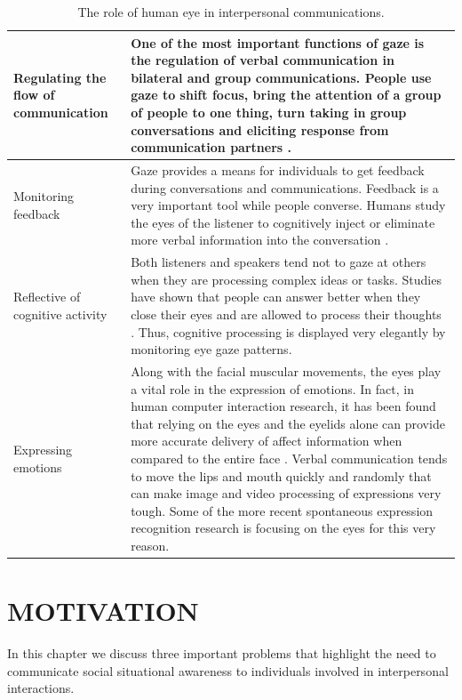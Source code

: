 \documentclass[oneside,11pt]{memoir}
\begin{document}
\begin{table}[hpdf]
\begin{center}
\caption{The role of human eye in interpersonal communications.}
\label{Tab:Table4}
\begin{tabularx}{5.5in}{|X|X|}
\hline
Regulating the flow of communication & One of the most important functions of gaze is the regulation of verbal communication in bilateral and group communications. People use gaze to shift focus, bring the attention of a group of people to one thing, turn taking in group conversations \cite{mast_dominance_2002} and eliciting response from communication partners \cite{bavelas_listener_2002}. \\
\hline
Monitoring feedback & Gaze provides a means for individuals to get feedback during conversations and communications. Feedback is a very important tool while people converse. Humans study the eyes of the listener to cognitively inject or eliminate more verbal information into the conversation \cite{van_dulmen_shifts_1997}. \\
\hline
Reflective of cognitive activity & Both listeners and speakers tend not to gaze at others when they are processing complex ideas or tasks. Studies have shown that people can answer better when they close their eyes and are allowed to process their thoughts \cite{glenberg_averting_1998}. Thus, cognitive processing is displayed very elegantly by monitoring eye gaze patterns. \\
\hline
Expressing emotions & Along with the facial muscular movements, the eyes play a vital role in the expression of emotions. In fact, in human computer interaction research, it has been found that relying on the eyes and the eyelids alone can provide more accurate delivery of affect information when compared to the entire face \cite{orozco_confidence_2008}. Verbal communication tends to move the lips and mouth quickly and randomly that can make image and video processing of expressions very tough. Some of the more recent spontaneous expression recognition research is focusing on the eyes for this very reason. \\
\hline
\end{tabularx}
\end{center}
\end{table}



\chapter{MOTIVATION}
\DoubleSpacing
\setlength{\parindent}{.5in}
In this chapter we discuss three important problems that highlight the need to communicate social situational awareness to individuals involved in interpersonal interactions.
\end{document}
